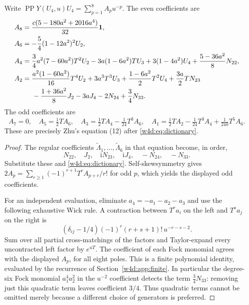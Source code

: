 \begin{proposition}\label{w4d:prop:44}
Write $\operatorname{PP} Y(U_4,u)U_4=\sum_{p=1}^8A_pu^{-p}$. The even coefficients are
\begin{align}
 A_8&=\frac{c(5-180a^2+2016a^4)}{32}\mathbf1,\label{w4d:eq:A8}\\
 A_6&=-\frac54(1-12a^2)^2U_2,\\
 A_4&=\frac34a^2(7-60a^2)T^2U_2-3a(1-6a^2)TU_3
       +3(1-4a^2)U_4+\frac{5-36a^2}{8}N_{22},\\
 A_2&=\frac{a^2(1-60a^2)}{16}T^4U_2+3a^3T^3U_3
       +\frac{1-6a^2}{2}T^2U_4+\frac{3a}{2}TN_{23}\notag\\
    &\hspace{5mm}-\frac{1+36a^2}{8}J_2-3aJ_4-2N_{24}+\frac34N_{33}.
\end{align}
The odd coefficients are
\[
 A_7=0,\quad A_5=\tfrac12TA_6,\quad
 A_3=\tfrac12TA_4-\tfrac1{24}T^3A_6,\quad
 A_1=\tfrac12TA_2-\tfrac1{24}T^3A_4+\tfrac1{240}T^5A_6.
\]
These are precisely Zhu's equation (12) after \eqref{w4d:eq:dictionary}.
\end{proposition}
\begin{proof}
The regular coefficients $\widetilde\Lambda_1,\ldots,\widetilde\Lambda_6$ in that equation become, in order,
\[
 N_{22},\quad J_2,\quad \mathrm iN_{23},\quad\mathrm iJ_4,
 \quad -N_{24},\quad -N_{33}.
\]
Substitute these and \eqref{w4d:eq:dictionary}. Self-skewsymmetry gives
$2A_p=\sum_{r\geq1}(-1)^{r+1}T^rA_{p+r}/r!$ for odd $p$, which yields the displayed odd coefficients.

For an independent evaluation, eliminate $a_4=-a_1-a_2-a_3$ and use the following exhaustive Wick rule. A contraction between $T^ra_i$ on the left and $T^sa_j$ on the right is
\begin{equation}\label{w4d:eq:wick}
 (\delta_{ij}-1/4)(-1)^r(r+s+1)!\,u^{-r-s-2}.
\end{equation}
Sum over all partial cross-matchings of the factors and Taylor-expand every uncontracted left factor by $e^{uT}$. The coefficient of each Fock monomial agrees with the displayed $A_p$, for all eight poles. This is a finite polynomial identity, evaluated by the recurrence of Section~\ref{w4d:app:finite}. In particular the degree-six Fock monomial $a_1^4a_2^2$ in the $u^{-2}$ coefficient detects the term $\tfrac34N_{33}$: removing just this quadratic term leaves coefficient $3/4$. Thus quadratic terms cannot be omitted merely because a different choice of generators is preferred.
\end{proof}

